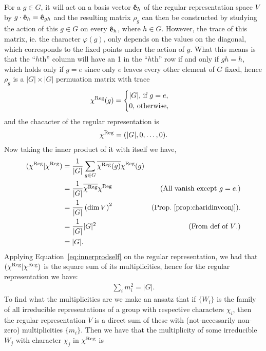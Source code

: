 For a $g \in G$, it will act on a basis vector $\mathbf{\hat{e}}_h$ of the regular representation space $V$ by $g \cdot \mathbf{\hat{e}}_{h} = \mathbf{\hat{e}}_{gh}$ and the resulting matrix $\rho_g$ can then be constructed by studying the action of this $g \in G$ on every $\mathbf{\hat{e}}_h$, where $h \in G$. However, the trace of this matrix, ie. the character $\varphi(g)$, only depends on the values on the diagonal, which corresponds to the fixed points under the action of $g$. What this means is that the ``$h$th'' column will have an 1 in the ``$h$th'' row if and only if $gh = h$, which holds only if $g = e$ since only $e$ leaves every other element of $G$ fixed, hence $\rho_g$ is a $|G| \times |G|$ permuation matrix with trace
\begin{align}\label{eq:regcharacter}
	\chi^{\text{Reg}}(g) = \begin{cases}
		|G| \text{, if $g = e$,} \\
		0 \text{, otherwise,}
	\end{cases}
\end{align}
and the chacacter of the regular representation is 
\begin{align*}
	\chi^{\text{Reg}} = (|G|, 0, \dots, 0).
\end{align*}
Now taking the inner product of it with itself we have,
\begin{align*}
	(\chi^{\text{Reg}}|\chi^{\text{Reg}}) &= \frac{1}{|G|} \sum_{g \in G} \overline{\chi^{\text{Reg}}(g)}\chi^{\text{Reg}}(g) \\
	&=  \frac{1}{|G|}  \overline{\chi^{\text{Reg}}}\chi^{\text{Reg}} & \text{(All vanish except $g=e$.)} \\
	&= \frac{1}{|G|} \left(\dim V \right)^2  & \text{(Prop.~\ref{prop:charidinvconj}).}\\
	&= \frac{1}{|G|}|G|^2 & \text{(From def of $V$.)} \\
	&= |G|.
\end{align*}
Applying Equation~\ref{eq:innerprodself} on the regular representation, we had  that $(\chi^{\text{Reg}}|\chi^{\text{Reg}}) $ is the square sum of its multiplicities, hence for the regular representation we have:
\begin{align}\label{eq:sqsummult}
	\sum_i m_i^2 = |G|.
\end{align}
To find what the multiplicities are we make an ansatz that if $\{W_i\}$ is the family of all irreducible representations of a group with respective characters $\chi_i$, then the regular representation $V$ is a direct sum of these with (not-necessarily non-zero) multiplicities $\{m_i\}$. Then we have that the multiplicity of some irreducible $W_j$ with character $\chi_j$ in $\chi^{\text{Reg}}$ is
